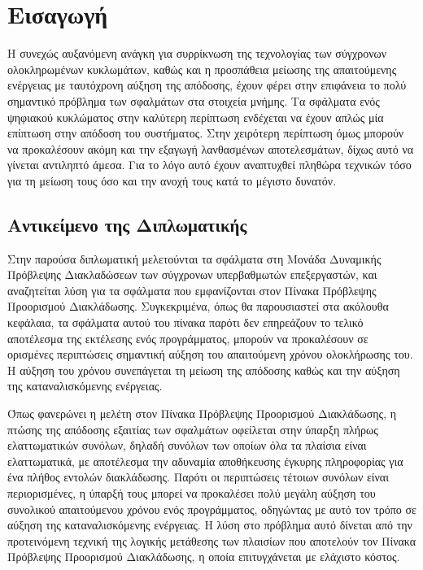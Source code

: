 \chapter{Εισαγωγή}
\label{chap1}

Η συνεχώς αυξανόμενη ανάγκη για συρρίκνωση της τεχνολογίας των σύγχρονων ολοκληρωμένων κυκλωμάτων, καθώς και η προσπάθεια μείωσης της απαιτούμενης ενέργειας με ταυτόχρονη αύξηση της απόδοσης, έχουν φέρει στην επιφάνεια το πολύ σημαντικό πρόβλημα των σφαλμάτων στα στοιχεία μνήμης. Τα σφάλματα ενός ψηφιακού κυκλώματος στην καλύτερη περίπτωση ενδέχεται να έχουν απλώς μία επίπτωση στην απόδοση του συστήματος. Στην χειρότερη περίπτωση όμως μπορούν να προκαλέσουν ακόμη και την εξαγωγή λανθασμένων αποτελεσμάτων, δίχως αυτό να γίνεται αντιληπτό άμεσα. Για το λόγο αυτό έχουν αναπτυχθεί πληθώρα τεχνικών τόσο για τη μείωση τους όσο και την ανοχή τους κατά το μέγιστο δυνατόν.


\section{Αντικείμενο της Διπλωματικής}
\label{chap1_Object}

Στην παρούσα διπλωματική μελετούνται τα σφάλματα στη Μονάδα Δυναμικής Πρόβλεψης Διακλαδώσεων των σύγχρονων υπερβαθμωτών επεξεργαστών, και αναζητείται λύση για τα σφάλματα που εμφανίζονται στον Πίνακα Πρόβλεψης Προορισμού Διακλάδωσης. Συγκεκριμένα, όπως θα παρουσιαστεί στα ακόλουθα κεφάλαια, τα σφάλματα αυτού του πίνακα παρότι δεν επηρεάζουν το τελικό αποτέλεσμα της εκτέλεσης ενός προγράμματος, μπορούν να προκαλέσουν σε ορισμένες περιπτώσεις σημαντική αύξηση του απαιτούμενη χρόνου ολοκλήρωσης του. Η αύξηση του χρόνου συνεπάγεται τη μείωση της απόδοσης καθώς και την αύξηση της καταναλισκόμενης ενέργειας.
\par
Όπως φανερώνει η μελέτη στον Πίνακα Πρόβλεψης Προορισμού Διακλάδωσης, η πτώσης της απόδοσης εξαιτίας των σφαλμάτων οφείλεται στην ύπαρξη πλήρως ελαττωματικών συνόλων, δηλαδή συνόλων των οποίων όλα τα πλαίσια είναι ελαττωματικά, με αποτέλεσμα την αδυναμία αποθήκευσης έγκυρης πληροφορίας για ένα πλήθος εντολών διακλάδωσης. Παρότι οι περιπτώσεις τέτοιων συνόλων είναι περιορισμένες, η ύπαρξή τους μπορεί να προκαλέσει πολύ μεγάλη αύξηση του συνολικού απαιτούμενου χρόνου ενός προγράμματος, οδηγώντας με αυτό τον τρόπο σε αύξηση της καταναλισκόμενης ενέργειας. Η λύση στο πρόβλημα αυτό δίνεται από την προτεινόμενη τεχνική της λογικής μετάθεσης των πλαισίων που αποτελούν τον Πίνακα Πρόβλεψης Προορισμού Διακλάδωσης, η οποία επιτυγχάνεται με ελάχιστο κόστος.

